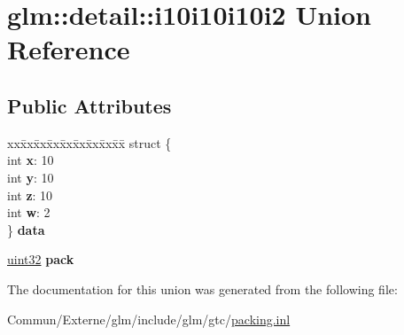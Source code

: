 \hypertarget{unionglm_1_1detail_1_1i10i10i10i2}{}\section{glm\+:\+:detail\+:\+:i10i10i10i2 Union Reference}
\label{unionglm_1_1detail_1_1i10i10i10i2}
\subsection*{Public Attributes}
\begin{DoxyCompactItemize}
\item 
\begin{tabbing}
xx\=xx\=xx\=xx\=xx\=xx\=xx\=xx\=xx\=\kill
struct \{\\
\>int {\bfseries x}: 10\\
\>int {\bfseries y}: 10\\
\>int {\bfseries z}: 10\\
\>int {\bfseries w}: 2\\
\} {\bfseries data}\hypertarget{unionglm_1_1detail_1_1i10i10i10i2_ab4c1d4602d19f6bdfdf850ff892cd0c7}{}\label{unionglm_1_1detail_1_1i10i10i10i2_ab4c1d4602d19f6bdfdf850ff892cd0c7}
\\

\end{tabbing}\item 
\hyperlink{group__gtc__type__precision_ga202b6a53c105fcb7e531f9b443518451}{uint32} {\bfseries pack}\hypertarget{unionglm_1_1detail_1_1i10i10i10i2_a24e2dc324c86589d568dc330904c859a}{}\label{unionglm_1_1detail_1_1i10i10i10i2_a24e2dc324c86589d568dc330904c859a}

\end{DoxyCompactItemize}


The documentation for this union was generated from the following file\+:\begin{DoxyCompactItemize}
\item 
Commun/\+Externe/glm/include/glm/gtc/\hyperlink{packing_8inl}{packing.\+inl}\end{DoxyCompactItemize}
